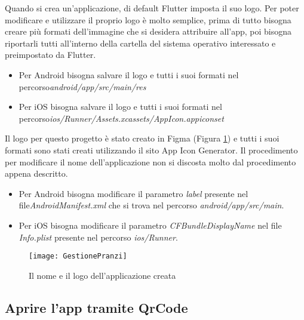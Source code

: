 Quando si crea un'applicazione, di default Flutter imposta il suo logo.\newline
Per poter modificare e utilizzare il proprio logo è molto semplice, prima di tutto bisogna creare più formati dell'immagine che si desidera attribuire all'app, poi bisogna riportarli tutti all'interno della cartella del sistema operativo interessato e preimpostato da Flutter.
\begin{itemize}
    \item Per Android bisogna salvare il logo e tutti i suoi formati nel percorso\newline \emph{android/app/src/main/res}
    \item Per iOS bisogna salvare il logo e tutti i suoi formati nel percorso\newline \emph{ios/Runner/Assets.xcassets/AppIcon.appiconset}
\end{itemize}
Il logo per questo progetto è stato creato in Figma (Figura \ref{fig:logo-nome}) e tutti i suoi formati sono stati creati utilizzando il sito App Icon Generator.\newline
\newline
Il procedimento per modificare il nome dell'applicazione non si discosta molto dal procedimento appena descritto.
\begin{itemize}
    \item Per Android bisogna modificare il parametro \emph{label} presente nel file\newline \emph{AndroidManifest.xml} che si trova nel percorso \emph{android/app/src/main}.
    \item Per iOS bisogna modificare il parametro \emph{CFBundleDisplayName} nel file \emph{Info.plist} presente nel percorso \emph{ios/Runner}.
\end{itemize}
\begin{figure}[!h] 
    \centering 
    \texttt{[image: GestionePranzi]} 
    \caption{Il nome e il logo dell'applicazione creata}
    \label{fig:logo-nome}
\end{figure}


\subsection{Aprire l'app tramite QrCode}

